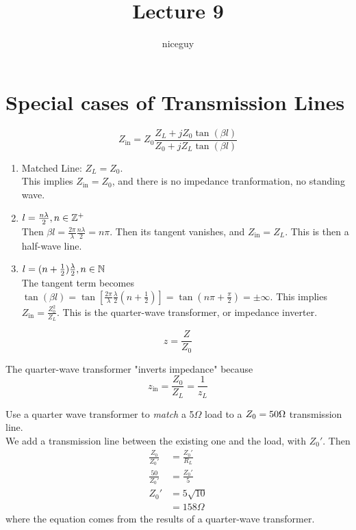 \documentclass[12pt]{article}
\title{Lecture 9}
\author{niceguy}
\begin{document}
\maketitle

\section{Special cases of Transmission Lines}

$$Z_{\text{in}} = Z_0 \frac{Z_L + jZ_0\tan(\beta l)}{Z_0 + jZ_L\tan(\beta l)}$$

\begin{enumerate}
    \item Matched Line: $Z_L = Z_0$. \\
        This implies $Z_{\text{in}} = Z_0$, and there is no impedance tranformation, no standing wave.
    \item $l = \frac{n\lambda}{2}, n \in \mathbb{Z}^+$ \\
        Then $\beta l = \frac{2\pi}{\lambda} \frac{n\lambda}{2} = n\pi$. Then its tangent vanishes, and $Z_{\text{in}} = Z_L$. This is then a half-wave line.
    \item $l = (n + \frac{1}{2}) \frac{\lambda}{2}, n \in \mathbb{N}$ \\
        The tangent term becomes $\tan(\beta l) = \tan\left[\frac{2\pi}{\lambda} \frac{\lambda}{2}\left(n+\frac{1}{2}\right)\right] = \tan\left(n\pi + \frac{\pi}{2}\right) = \pm\infty$. This implies $Z_{\text{in}} = \frac{Z_0^2}{Z_L}$. This is the quarter-wave transformer, or impedance inverter.
\end{enumerate}

\begin{defn}
    $$z = \frac{Z}{Z_0}$$
\end{defn}

The quarter-wave transformer "inverts impedance" because
$$z_{\text{in}} = \frac{Z_0}{Z_L} = \frac{1}{z_L}$$

\begin{ex}
    Use a quarter wave transformer to \textit{match} a 5$\Omega$ load to a $Z_0 = 50\unit\Omega$ transmission line. \\
    We add a transmission line between the existing one and the load, with $Z_0'$. Then
    \begin{align*}
        \frac{Z_0}{Z_0'} &= \frac{Z_0'}{R_L} \\
        \frac{50}{Z_0'} &= \frac{Z_0'}{5} \\
        Z_0' &= 5\sqrt{10} \\
             &= 158\unit{\Omega}
    \end{align*}
    where the equation comes from the results of a quarter-wave transformer.
\end{ex}
\end{document}
